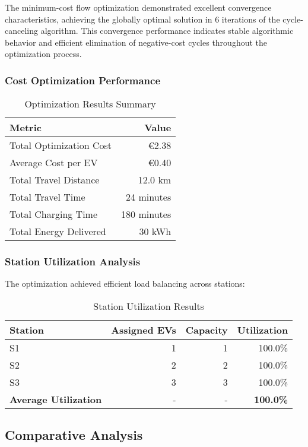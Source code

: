\documentclass[12pt,a4paper]{article}
\begin{document}
The minimum-cost flow optimization demonstrated excellent convergence characteristics, achieving the globally optimal solution in 6 iterations of the cycle-canceling algorithm. This convergence performance indicates stable algorithmic behavior and efficient elimination of negative-cost cycles throughout the optimization process.

\subsubsection{Cost Optimization Performance}

\begin{table}[h]
\centering
\caption{Optimization Results Summary}
\begin{tabular}{@{}lr@{}}
\toprule
Metric & Value \\
\midrule
Total Optimization Cost & €2.38 \\
Average Cost per EV & €0.40 \\
Total Travel Distance & 12.0 km \\
Total Travel Time & 24 minutes \\
Total Charging Time & 180 minutes \\
Total Energy Delivered & 30 kWh \\
\bottomrule
\end{tabular}
\end{table}

\subsubsection{Station Utilization Analysis}
The optimization achieved efficient load balancing across stations:

\begin{table}[h]
\centering
\caption{Station Utilization Results}
\begin{tabular}{@{}lrrr@{}}
\toprule
Station & Assigned EVs & Capacity & Utilization \\
\midrule
S1 & 1 & 1 & 100.0\% \\
S2 & 2 & 2 & 100.0\% \\
S3 & 3 & 3 & 100.0\% \\
\midrule
\textbf{Average Utilization} & - & - & \textbf{100.0\%} \\
\bottomrule
\end{tabular}
\end{table}

\subsection{Comparative Analysis}
\end{document}
